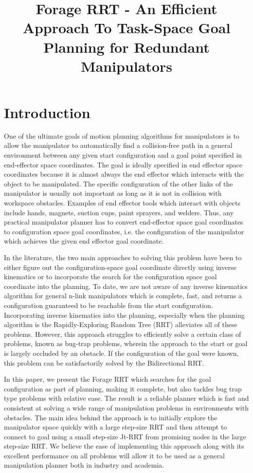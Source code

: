 \documentclass[conference]{IEEEtran}
\begin{document}
\title{Forage RRT - An Efficient Approach To Task-Space Goal Planning for Redundant Manipulators}
\maketitle
\section{Introduction}
One of the ultimate goals of motion planning algorithms for manipulators is to allow the manipulator to automatically find a collision-free
path in a general environment between any given start configuration and a goal point specified in end-effector space coordinates. The goal
is ideally specified in end effector space coordinates because it is almost always the end effector which interacts with the object to be
manipulated. The specific configuration of the other links of the manipulator is usually not important as long as it is not in collision
with workspace obstacles. Examples of end effector tools which interact with objects include hands, magnets, suction cups, paint sprayers,
and welders. Thus, any practical manipulator planner has to convert end-effector space goal coordinates to configuration space goal
coordinates, i.e. the configuration of the manipulator which achieves the given end effector goal coordinate.

In the literature, the two main approaches to solving this problem have been to either figure out the configuration-space goal coordinate
directly using inverse kinematics or to incorporate the search for the configuration space goal coordinate into the planning. To date, we
are not aware of any inverse kinematics algorithm for general n-link manipulators which is complete, fast, and returns a configuration
guaranteed to be reachable from the start configuration. Incorporating inverse kinematics into the planning, especially when the planning
algorithm is the Rapidly-Exploring Random Tree (RRT) alleviates all of these problems. However, this approach struggles to efficiently solve
a certain class of problems, known as bug-trap problems, wherein the approach to the start or goal is largely occluded by an obstacle. If
the configuration of the goal were known, this problem can be satisfactorily solved by the Bidirectional RRT. 

In this paper, we present the Forage RRT which searches for the goal configuration as part of planning, making it complete, but also tackles
bug trap type problems with relative ease. The result is a reliable planner which is fast and consistent at solving a wide range of
manipulation problems in environments with obstacles. The main idea behind the approach is to initially explore the manipulator space
quickly with a large step-size RRT and then attempt to connect to goal using a small step-size Jt-RRT from promising nodes in the large
step-size RRT. We believe the ease of implementing this approach along with its excellent performance on all problems will allow it to be
used as a general manipulation planner both in industry and academia.
\end{document}
